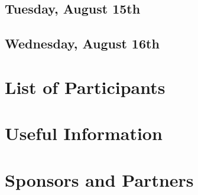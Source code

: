 \documentclass[openany, parskip=full, 12pt, a4]{scrbook}
\begin{document}






\section{Tuesday, August 15th}













\section{Wednesday, August 16th}










\chapter{List of Participants}
 

 
\chapter{Useful Information}



\chapter{Sponsors and Partners}



\newpage


\pagecolor{myblue}
\thispagestyle{empty}
\mbox{}
\end{document}
